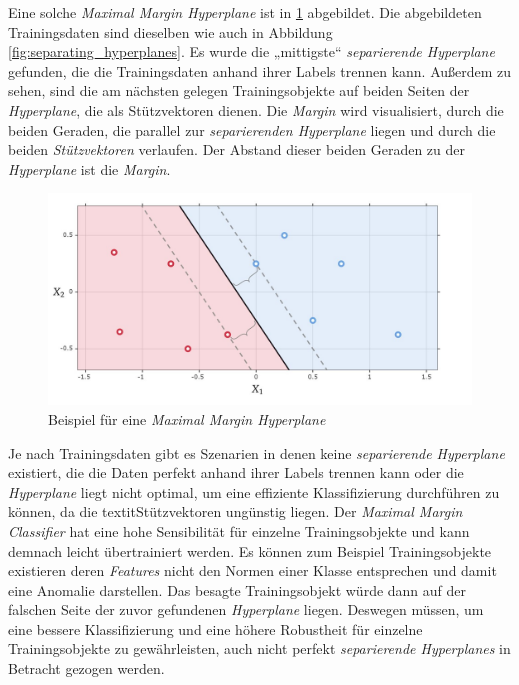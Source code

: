 Eine solche \textit{Maximal Margin Hyperplane} ist in \ref{fig:maximal_margin} abgebildet. Die abgebildeten Trainingsdaten sind dieselben
wie auch in Abbildung \ref{fig:separating_hyperplanes}. Es wurde die „mittigste“ \textit{separierende Hyperplane} gefunden, die die Trainingsdaten
anhand ihrer Labels trennen kann. Außerdem zu sehen, sind die am nächsten gelegen Trainingsobjekte auf beiden Seiten der \textit{Hyperplane}, die als
Stützvektoren dienen. Die \textit{Margin} wird visualisiert, durch die beiden Geraden, die parallel zur \textit{separierenden Hyperplane} liegen und
durch die beiden \textit{Stützvektoren} verlaufen. Der Abstand dieser beiden Geraden zu der \textit{Hyperplane} ist die \textit{Margin}.
\begin{figure}[H]
	\centering
	\includegraphics[width=\imgMed]{images/theory/maximal_margin.jpg}
	\caption{Beispiel für eine \textit{Maximal Margin Hyperplane}} 
	\label{fig:maximal_margin}
\end{figure}
Je nach Trainingsdaten gibt es Szenarien in denen keine \textit{separierende Hyperplane} existiert, die die Daten perfekt anhand ihrer Labels
trennen kann oder die \textit{Hyperplane} liegt nicht optimal, um eine effiziente Klassifizierung durchführen zu können, da die
textit{Stützvektoren} ungünstig liegen. Der \textit{Maximal Margin Classifier} hat eine hohe Sensibilität für einzelne Trainingsobjekte
und kann demnach leicht übertrainiert werden. Es können zum Beispiel Trainingsobjekte existieren deren \textit{Features} nicht den Normen einer Klasse entsprechen 
und damit eine Anomalie darstellen. Das besagte Trainingsobjekt würde dann auf der falschen Seite der zuvor gefundenen \textit{Hyperplane} liegen.
Deswegen müssen, um eine bessere Klassifizierung und eine höhere Robustheit für einzelne Trainingsobjekte
zu gewährleisten, auch nicht perfekt \textit{separierende Hyperplanes} in Betracht gezogen werden.\cite[S. 343 - 345]{james_2013}

